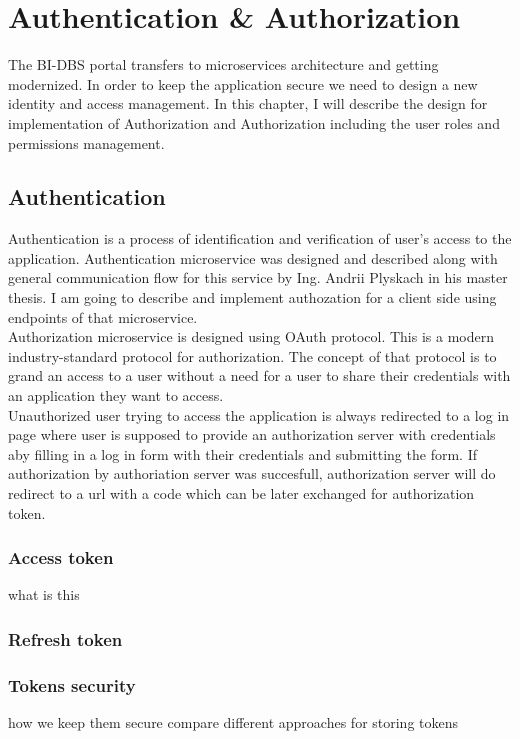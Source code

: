 \chapter{Authentication \& Authorization}

The BI-DBS portal transfers to microservices architecture and getting\\  
 modernized. In order to keep the application secure we need to design a new identity and access management. In this chapter, I will describe the design for implementation of Authorization and Authorization including the user roles and permissions management.

\section{Authentication}\label{sec:authentication}

Authentication is a process of identification and verification of user's access to the application. Authentication microservice was designed and described along with general communication flow for this service by Ing. Andrii Plyskach in his master thesis. I am going to describe and implement authozation for a client side using endpoints of that microservice.
\\Authorization microservice is designed using OAuth protocol. This is a modern industry-standard protocol for authorization. The concept of that protocol is to grand an access to a user without a need for a user to share their credentials with an application they want to access. 
\\ Unauthorized user trying to access the application is always redirected to a log in page where user is supposed to provide an authorization server with credentials aby filling in a log in form with their credentials and submitting the form. If authorization by authoriation server was succesfull, authorization server will do redirect to a url with a code which can be later exchanged for authorization token. 


\subsection{Access token}
what is this

\subsection{Refresh token}

\subsection{Tokens security}
how we keep them secure
compare different approaches for storing tokens

